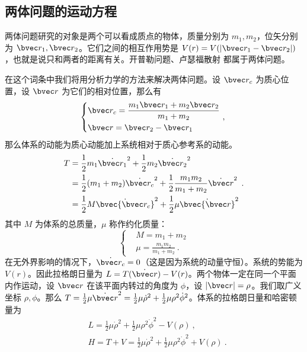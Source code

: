 

\subsection{两体问题的运动方程}
两体问题研究的对象是两个可以看成质点的物体，质量分别为 $m_1,m_2$，位矢分别为 $\bvec r_1,\bvec r_2$。它们之间的相互作用势是 $V(r)=V(|\bvec r_1-\bvec r_2|)$，也就是说只和两者的距离有关。开普勒问题、卢瑟福散射 都属于两体问题。

在这个词条中我们将用分析力学的方法来解决两体问题。设 $\bvec r_c$ 为质心位置，设 $\bvec r$ 为它们的相对位置，那么有
\begin{equation}
\left\{
\begin{aligned}
&\bvec r_c=\frac{m_1\bvec r_1+ m_2\bvec r_2}{m_1+m_2}\\
&\bvec r=\bvec r_2-\bvec r_1
\end{aligned}~,
\right.
\end{equation}
那么体系的动能为质心动能加上系统相对于质心参考系的动能。
\begin{equation}
\begin{aligned}
T&=\frac{1}{2}m_1 \dot{\bvec r_1}^2+\frac{1}{2}m_2 \dot{\bvec r_2}^2\\
&=\frac{1}{2}(m_1+m_2)\dot{\bvec r_c}^2+\frac{1}{2}\frac{m_1m_2}{m_1+m_2}\dot{\bvec r}^2\\
&=\frac{1}{2}M \dot{\bvec{\bvec r_c}}^2+\frac{1}{2}\mu \dot{\bvec{\bvec r}}^2
\end{aligned}~.
\end{equation}
其中 $M$ 为体系的总质量，$\mu$ 称作约化质量：
\begin{equation}
\left\{
\begin{aligned}
&M=m_1+m_2\\
&\mu=\frac{m_1m_2}{m_1+m_2}~.
\end{aligned}
\right.
\end{equation}
在无外界影响的情况下，$\dot{\bvec r_c}=0$（这是因为系统的动量守恒）。系统的势能为 $V(r)$。因此拉格朗日量为 $L=T(\dot{\bvec r})-V(r)$。两个物体一定在同一个平面内作运动，设 $\bvec r$ 在该平面内转过的角度为 $\phi$，设 $|\bvec r|=\rho$。我们取广义坐标 $\rho,\phi$。那么 $T=\frac{1}{2}\mu \dot{\bvec r}^2=\frac{1}{2}\mu \dot \rho^2+\frac{1}{2}\mu \rho^2\dot\phi^2$。体系的拉格朗日量和哈密顿量为
\begin{equation}
\begin{aligned}
&L=\frac{1}{2}\mu \dot \rho^2+\frac{1}{2}\mu \rho^2\dot\phi^2-V(\rho)~,\\
&H=T+V=\frac{1}{2}\mu \dot \rho^2+\frac{1}{2}\mu \rho^2\dot\phi^2+V(\rho)~.
\end{aligned}
\end{equation}
